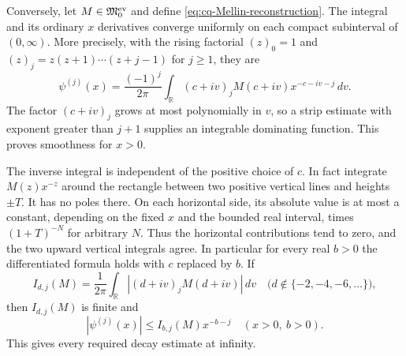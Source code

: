 Conversely, let $M\in\mathfrak M_0^{\rm ev}$ and define
\eqref{eq:cq-Mellin-reconstruction}. The integral and its
ordinary $x$ derivatives converge uniformly on each compact
subinterval of $(0,\infty)$. More precisely, with the rising
factorial $(z)_0=1$ and
$(z)_j=z(z+1)\cdots(z+j-1)$ for $j\geq1$, they are
\begin{equation}\label{eq:cq-Mellin-differentiated-inverse}
 \psi^{(j)}(x)=\frac{(-1)^j}{2\pi}
       \int_{\mathbb R}(c+iv)_jM(c+iv)x^{-c-iv-j}\,dv.
\end{equation}
The factor $(c+iv)_j$ grows at most polynomially in $v$,
so a strip estimate with exponent greater than $j+1$ supplies
an integrable dominating function. This proves smoothness for $x>0$.

The inverse integral is independent of the positive choice of
$c$. In fact integrate $M(z)x^{-z}$ around the rectangle
between two positive vertical lines and heights $\pm T$.
It has no poles there. On each horizontal side, its absolute
value is at most a constant, depending on the fixed $x$ and
the bounded real interval, times $(1+T)^{-N}$ for arbitrary
$N$. Thus the horizontal contributions tend to zero, and the
two upward vertical integrals agree. In particular for every
real $b>0$ the differentiated formula holds with $c$ replaced
by $b$. If
\begin{equation}\label{eq:cq-Mellin-line-integral}
 I_{d,j}(M)=\frac1{2\pi}\int_{\mathbb R}
                |(d+iv)_jM(d+iv)|\,dv
 \quad\bigl(d\notin\{-2,-4,-6,\ldots\}\bigr),
\end{equation}
then $I_{d,j}(M)$ is finite and
\begin{equation}\label{eq:cq-Mellin-infinity-bound}
 |\psi^{(j)}(x)|\leq I_{b,j}(M)x^{-b-j}
 \quad(x>0,\ b>0).
\end{equation}
This gives every required decay estimate at infinity.

